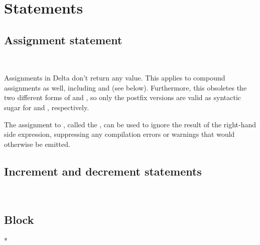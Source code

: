 
\chapter{Statements}

\section{Assignment statement}

\begin{grammar}
 \textrightarrow{}  \code{=}  \code{;}\\
 \textrightarrow{} \code{_} \code{=}  \code{;}
\end{grammar}

Assignments in Delta don't return any value. This applies to compound
assignments as well, including \code{++} and \code{--} (see below). Furthermore,
this obsoletes the two different forms of \code{++} and \code{--}, so only the
postfix versions are valid as syntactic sugar for  and ,
respectively.

The assignment to \code{_}, called the , can
be used to ignore the result of the right-hand side expression, suppressing any
compilation errors or warnings that would otherwise be emitted.

\section{Increment and decrement statements}

\begin{grammar}
 \textrightarrow{}  \code{++} \code{;}\\
 \textrightarrow{}  \code{--} \code{;}
\end{grammar}

\section{Block}

\begin{grammar}
 \textrightarrow{} \code{\{} * \code{\}}
\end{grammar}

